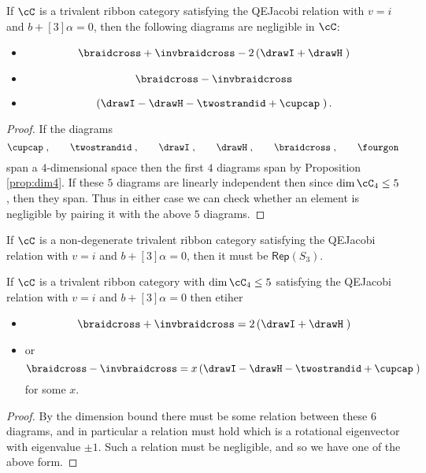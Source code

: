 \documentclass[12pt]{amsart}
\begin{document}
\begin{lemma}
If $\cC$ is a trivalent ribbon category satisfying the QEJacobi relation with $v=i$ and $b+[3]\alpha = 0$, then the following diagrams are negligible in $\cC$:
\begin{itemize}
\item $$\braidcross + \invbraidcross - 2 \left(\drawI + \drawH \;\right)$$
\item $$\braidcross - \invbraidcross$$
\item $$\left(\drawI - \drawH - \twostrandid + \cupcap\;\right).$$
\end{itemize}
\end{lemma}
\begin{proof}
If the diagrams
  \[
  \cupcap\;,\qquad\twostrandid\;,
    \qquad\drawI\;,\qquad\drawH\;,\qquad\braidcross\;,\qquad\fourgon\;
   \]
 span a $4$-dimensional space then the first $4$ diagrams span by Proposition \ref{prop:dim4}.  If these $5$ diagrams are linearly independent then since $\dim \cC_4 \leq 5$, then they span.  Thus in either case we can check whether an element is negligible by pairing it with the above $5$ diagrams.
\end{proof}

\begin{corollary}
If $\cC$ is a non-degenerate trivalent ribbon category satisfying the QEJacobi relation with $v=i$ and $b+[3]\alpha = 0$, then it must be $\mathsf{Rep}(S_3)$.
\end{corollary}

\begin{corollary}
If $\cC$ is a trivalent ribbon category with $\dim \cC_4 \leq 5$ satisfying the QEJacobi relation with $v=i$ and $b+[3]\alpha = 0$ then etiher
\begin{itemize}
\item $$\braidcross + \invbraidcross = 2 \left(\drawI + \drawH \;\right)$$ 
\item or $$\braidcross - \invbraidcross = x \left(\drawI - \drawH - \twostrandid + \cupcap\;\right)$$ for some $x$.
\end{itemize}
\end{corollary}
\begin{proof}
By the dimension bound there must be some relation between these $6$ diagrams, and in particular a relation must hold which is a rotational eigenvector with eigenvalue $\pm 1$.  Such a relation must be negligible, and so we have one of the above form.
\end{proof}
\end{document}
